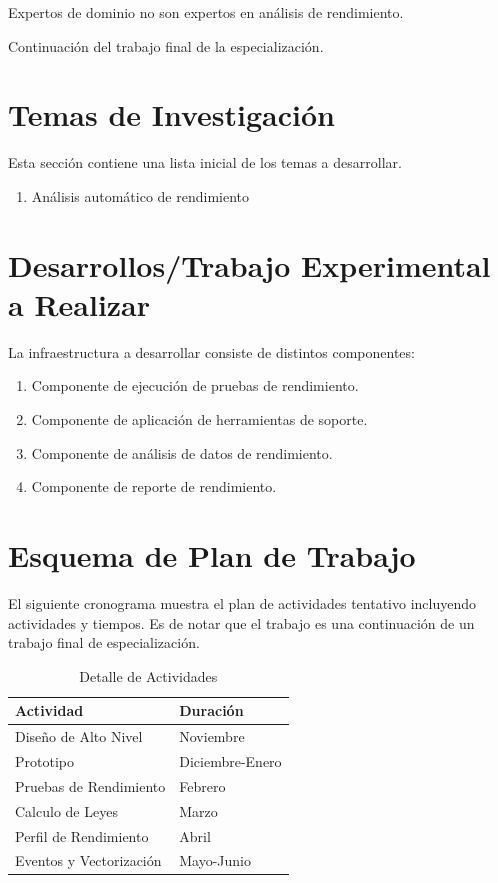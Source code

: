\documentclass[a4paper]{article}
\begin{document}
Expertos de dominio no son expertos en análisis de rendimiento.

\smallskip

Continuación del trabajo final de la especialización.

\section{Temas de Investigación}

Esta sección contiene una lista inicial de los temas a desarrollar.

\begin{enumerate}
\item Análisis automático de rendimiento
\end{enumerate}

\section{Desarrollos/Trabajo Experimental a Realizar}

La infraestructura a desarrollar consiste de distintos componentes:

  \begin{enumerate}
  \item Componente de ejecución de pruebas de rendimiento.
  \item Componente de aplicación de herramientas de soporte.
  \item Componente de análisis de datos de rendimiento.
  \item Componente de reporte de rendimiento.
  \end{enumerate}



\section{Esquema de Plan de Trabajo}

El siguiente cronograma muestra el plan de actividades tentativo incluyendo actividades y tiempos.
Es de notar que el trabajo es una continuación de un trabajo final de especialización.

\begin{table}[H]
    \caption{Detalle de Actividades}
  \centering
    \begin{tabular}{|l|l|}\hline
      {\bf Actividad} & {\bf Duración} \\ \hline
      Diseño de Alto Nivel & Noviembre \\ \hline
      Prototipo & Diciembre-Enero \\ \hline
      Pruebas de Rendimiento & Febrero \\ \hline
      Calculo de Leyes & Marzo \\ \hline
      Perfil de Rendimiento & Abril \\ \hline
      Eventos y Vectorización & Mayo-Junio \\ \hline
    \end{tabular}
  \label{schedule}
\end{table}
\end{document}
